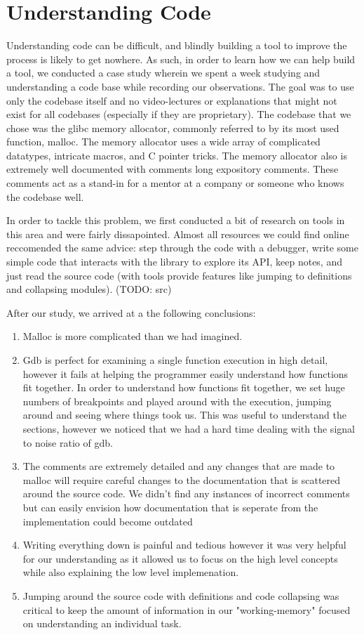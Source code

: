 \chapter{Understanding Code}
Understanding code can be difficult, and blindly building a tool to improve the process is likely to get nowhere. As such, in order to learn how we can help build a tool, we conducted a case study wherein we spent a week studying and understanding a code base while recording our observations. The goal was to use only the codebase itself and no video-lectures or explanations that might not exist for all codebases (especially if they are proprietary). The codebase that we chose was the glibc memory allocator, commonly referred to by its most used function, malloc. The memory allocator uses a wide array of complicated datatypes, intricate macros, and C pointer tricks. The memory allocator also is extremely well documented with comments long expository comments. These comments act as a stand-in for a mentor at a company or someone who knows the codebase well.

In order to tackle this problem, we first conducted a bit of research on tools in this area and were fairly dissapointed. Almost all resources we could find online reccomended the same advice: step through the code with a debugger, write some simple code that interacts with the library to explore its API, keep notes, and just read the source code (with tools provide features like jumping to definitions and collapsing modules). (TODO: src)

\noindent After our study, we arrived at a the following conclusions:
\begin{enumerate}
    \item Malloc is more complicated than we had imagined.
    \item Gdb is perfect for examining a single function execution in high detail, however it fails at helping the programmer easily understand how functions fit together. In order to understand how functions fit together, we set huge numbers of breakpoints and played around with the execution, jumping around and seeing where things took us. This was useful to understand the sections, however we noticed that we had a hard time dealing with the signal to noise ratio of gdb. 
    \item The comments are extremely detailed and any changes that are made to malloc will require careful changes to the documentation that is scattered around the source code. We didn't find any instances of incorrect comments but can easily envision how documentation that is seperate from the implementation could become outdated
    \item Writing everything down is painful and tedious however it was very helpful for our understanding as it allowed us to focus on the high level concepts while also explaining the low level implemenation.
    \item Jumping around the source code with definitions and code collapsing was critical to keep the amount of information in our "working-memory" focused on understanding an individual task.
\end{enumerate}

